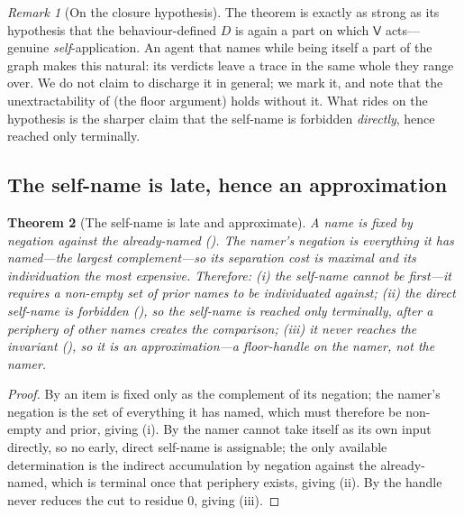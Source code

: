 \documentclass[twocolumn,11pt,a4paper]{article}
\theoremstyle{sup}
\newtheorem{theorem}{Theorem}[section]
\theoremstyle{definition}
\theoremstyle{remark}
\newtheorem{remark}[theorem]{Remark}
\begin{document}
\begin{remark}[On the closure hypothesis]
\label{rem:closure}
The theorem is exactly as strong as its hypothesis that the behaviour-defined $D$
is again a part on which $\mathsf{V}$ acts---genuine \emph{self}-application. An
agent that names while being itself a part of the graph makes this natural: its
verdicts leave a trace in the same whole they range over. We do not claim to
discharge it in general; we mark it, and note that the unextractability of
 (the floor argument) holds without it. What rides on the
hypothesis is the sharper claim that the self-name is forbidden \emph{directly},
hence reached only terminally.
\end{remark}

\subsection{The self-name is late, hence an approximation}

\begin{theorem}[The self-name is late and approximate]
\label{thm:self-late}
A name is fixed by negation against the already-named (). The
namer's negation is everything it has named---the largest complement---so its
separation cost is maximal and its individuation the most expensive. Therefore:
\textup{(i)} the self-name cannot be first---it requires a non-empty set of prior
names to be individuated against; \textup{(ii)} the direct self-name is forbidden
(), so the self-name is reached only \emph{terminally},
after a periphery of other names creates the comparison; \textup{(iii)} it never
reaches the invariant (), so it is an
\emph{approximation}---a floor-handle on the namer, not the namer.
\end{theorem}

\begin{proof}
By  an item is fixed only as the complement of its negation;
the namer's negation is the set of everything it has named, which must therefore
be non-empty and prior, giving (i). By  the namer cannot
take itself as its own input directly, so no early, direct self-name is
assignable; the only available determination is the indirect accumulation by
negation against the already-named, which is terminal once that periphery exists,
giving (ii). By  the handle never reduces
the cut to residue $0$, giving (iii).
\end{proof}
\end{document}
